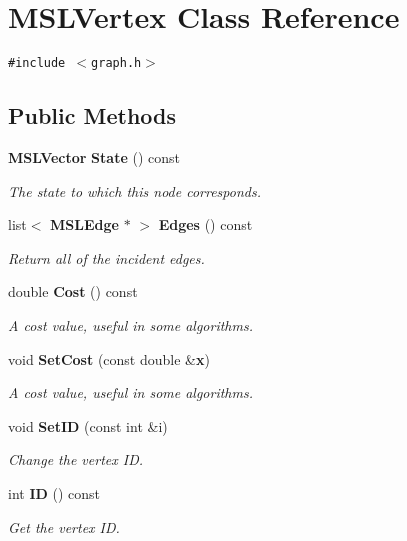 \section{MSLVertex  Class Reference}
\label{classMSLVertex}
{\tt \#include $<$graph.h$>$}

\subsection*{Public Methods}
\begin{CompactItemize}
\item 
{\bf MSLVector} {\bf State} () const
\begin{CompactList}\small\item\em The state to which this node corresponds.\item\end{CompactList}\item 
list$<$ {\bf MSLEdge} $\ast$ $>$ {\bf Edges} () const
\begin{CompactList}\small\item\em Return all of the incident edges.\item\end{CompactList}\item 
double {\bf Cost} () const
\begin{CompactList}\small\item\em A cost value, useful in some algorithms.\item\end{CompactList}\item 
void {\bf Set\-Cost} (const double \&{\bf x})
\begin{CompactList}\small\item\em A cost value, useful in some algorithms.\item\end{CompactList}\item 
void {\bf Set\-ID} (const int \&i)
\begin{CompactList}\small\item\em Change the vertex ID.\item\end{CompactList}\item 
int {\bf ID} () const
\begin{CompactList}\small\item\em Get the vertex ID.\item\end{CompactList}\item 

\end{CompactItemize}
